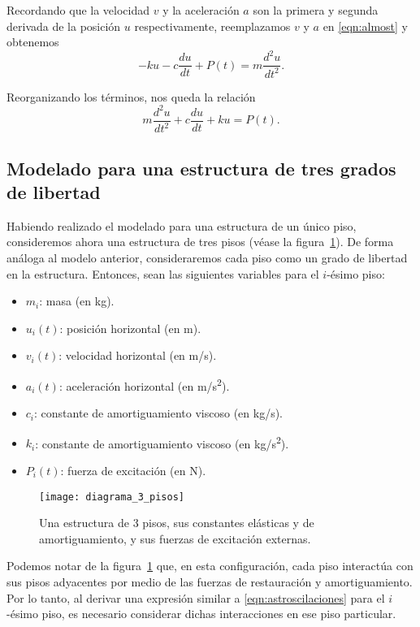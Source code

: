 Recordando que la velocidad \(v\) y la aceleración \(a\) son la primera y segunda derivada de la posición \(u\) respectivamente, reemplazamos \(v\) y \(a\) en \eqref{eqn:almost} y obtenemos
\begin{equation}
    -ku - c\frac{du}{dt} + P(t) = m\frac{d^2u}{dt^2}
.\end{equation}

Reorganizando los términos, nos queda la relación
\begin{equation}\label{eqn:astroscilaciones}
    m\frac{d^2u}{dt^2} + c\frac{du}{dt} + ku = P(t)
.\end{equation}

\subsection{Modelado para una estructura de tres grados de libertad}

Habiendo realizado el modelado para una estructura de un único piso, consideremos ahora una estructura de tres pisos (véase la figura~\ref{fig:3-floor-diagram}). De forma análoga al modelo anterior, consideraremos cada piso como un grado de libertad en la estructura. Entonces, sean las siguientes variables para el \(i\)-ésimo piso:

\begin{itemize}
    \item \(m_i\): masa (en \si{kg}).
    \item \(u_i(t)\): posición horizontal (en \si{m}).
    \item \(v_i(t)\): velocidad horizontal (en \si{m/s}).
    \item \(a_i(t)\): aceleración horizontal (en \si{m/s^2}).
    \item \(c_i\): constante de amortiguamiento viscoso (en \si{kg/s}).
    \item \(k_i\): constante de amortiguamiento viscoso (en \si{kg/s^2}).
    \item \(P_i(t)\): fuerza de excitación (en \si{N}).
\end{itemize}

\begin{figure}[h]
    \centering
    \texttt{[image: diagrama\_3\_pisos]}
    \caption{Una estructura de 3 pisos, sus constantes elásticas y de amortiguamiento, y sus fuerzas de excitación externas.}
    \label{fig:3-floor-diagram}
\end{figure}

Podemos notar de la figura~\ref{fig:3-floor-diagram} que, en esta configuración, cada piso interactúa con sus pisos adyacentes por medio de las fuerzas de restauración y amortiguamiento. Por lo tanto, al derivar una expresión similar a \eqref{eqn:astroscilaciones} para el \(i\)-ésimo piso, es necesario considerar dichas interacciones en ese piso particular.

